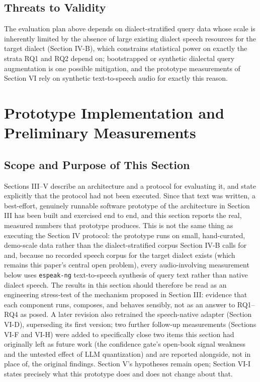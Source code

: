 \documentclass[conference]{IEEEtran}
\begin{document}
\subsection{Threats to Validity}
The evaluation plan above depends on dialect-stratified query data whose scale is inherently limited by the absence of large existing dialect speech resources for the target dialect (Section IV-B), which constrains statistical power on exactly the strata RQ1 and RQ2 depend on; bootstrapped or synthetic dialectal query augmentation is one possible mitigation, and the prototype measurements of Section VI rely on synthetic text-to-speech audio for exactly this reason.

\section{Prototype Implementation and Preliminary Measurements}

\subsection{Scope and Purpose of This Section}
Sections III--V describe an architecture and a protocol for evaluating it, and state explicitly that the protocol had not been executed. Since that text was written, a best-effort, genuinely runnable software prototype of the architecture in Section III has been built and exercised end to end, and this section reports the real, measured numbers that prototype produces. This is not the same thing as executing the Section IV protocol: the prototype runs on small, hand-curated, demo-scale data rather than the dialect-stratified corpus Section IV-B calls for and, because no recorded speech corpus for the target dialect exists (which remains this paper's central open problem), every audio-involving measurement below uses \texttt{espeak-ng} text-to-speech synthesis of query text rather than native dialect speech. The results in this section should therefore be read as an engineering stress-test of the mechanism proposed in Section III: evidence that each component runs, composes, and behaves sensibly, not as an answer to RQ1--RQ4 as posed. A later revision also retrained the speech-native adapter (Section VI-D), superseding its first version; two further follow-up measurements (Sections VI-F and VI-H) were added to specifically close two items this section had originally left as future work (the confidence gate's open-book signal weakness and the untested effect of LLM quantization) and are reported alongside, not in place of, the original findings. Section V's hypotheses remain open; Section VI-I states precisely what this prototype does and does not change about that.
\end{document}
